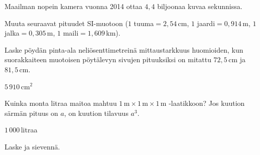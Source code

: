 \begin{tehtavasivu}
\begin{tehtava}
Maailman nopein kamera vuonna 2014 ottaa $4,4$ biljoonaa kuvaa sekunnissa.
	\begin{vastaus}
	\end{vastaus}
\end{tehtava}



\begin{tehtava}
Muuta seuraavat pituudet SI-muotoon ($1$ tuuma$= 2,54$\,cm, $1$ jaardi$=0,914$\,m, $1$ jalka$= 0,305$\,m, $1$ maili$ = 1,609$\,km).
	\begin{vastaus}
	\end{vastaus}
\end{tehtava}

\begin{tehtava}
Laske pöydän pinta-ala neliösenttimetreinä mittaustarkkuus huomioiden, kun suorakkaiteen muotoisen pöytälevyn sivujen pituuksiksi on mitattu $72,5$\,cm ja $81,5$\,cm.
	\begin{vastaus}
$5\,910$\,cm$^2$
	\end{vastaus}
\end{tehtava}

\begin{tehtava}
Kuinka monta litraa maitoa mahtuu $1\,\textrm{m}\times 1\,\textrm{m}\times 1\,\textrm{m}$ -laatikkoon? Jos kuution särmän pituus on $a$, on kuution tilavuus $a^3$.
	\begin{vastaus}
	$1\,000$\,litraa
	\end{vastaus}
\end{tehtava}

\begin{tehtava}
Laske ja sievennä.
	\begin{vastaus}
		\end{vastaus}
\end{tehtava}


\end{tehtavasivu}
